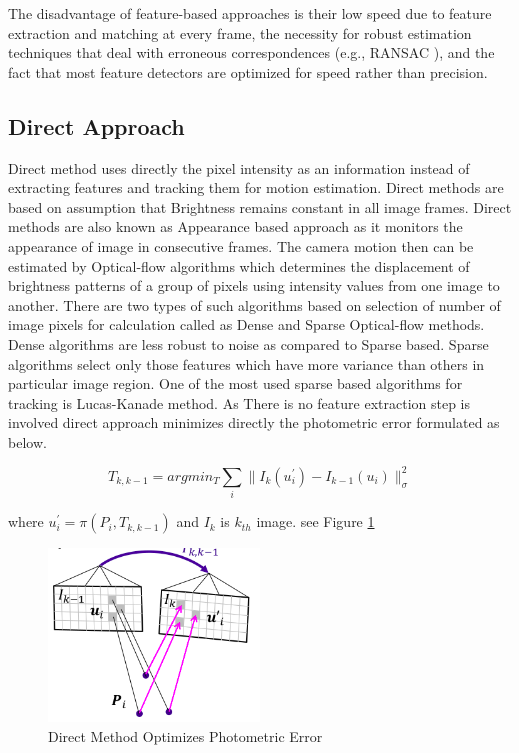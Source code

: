 The disadvantage of feature-based approaches is their low speed due to feature extraction and matching at every frame, the necessity for robust estimation techniques that deal with erroneous correspondences (e.g., RANSAC ), and the fact that most feature detectors are optimized for speed rather than precision.\cite{7782863}

\subsection{Direct Approach}

Direct method uses directly the pixel intensity as an information instead of extracting features and tracking them for motion estimation. Direct methods are based on assumption that Brightness remains constant in all image frames.\cite{Irani-et-al-1999} Direct methods are also known as Appearance based approach as it monitors the appearance of image in consecutive frames. The camera motion then can be estimated by Optical-flow algorithms which determines the displacement of brightness patterns of a group of pixels using intensity values from one image to another.\cite{Aqel-et-al-2016} There are two types of such algorithms based on selection of number of image pixels for calculation called as Dense and Sparse Optical-flow methods. Dense algorithms are less robust to noise as compared to Sparse based. Sparse algorithms select only those features which have more variance than others in particular image region. One of the most used sparse based algorithms for tracking is Lucas-Kanade method.\cite{Lucas81aniterative} As There is no feature extraction step is involved direct approach minimizes directly the photometric error formulated as below. 

\begin{equation*}
	T_{k,k-1} = arg min_{T} \sum_{i} \| I_{k}(u^{'}_{i})- I_{k-1}(u_{i})\|^{2}_{\sigma}
\end{equation*}
 
 where   $u^{'}_{i} = \pi (P_{i},T_{k,k-1})$ and $I_{k} $ is  $k_{th}$ image. see Figure \ref{fig:Direct}
 
 \begin{figure}[h]
 	\centering
 	\includegraphics[width=0.5\textwidth]{direct}
 	\caption{Direct Method Optimizes Photometric Error}
 	\label{fig:Direct}
 \end{figure}

